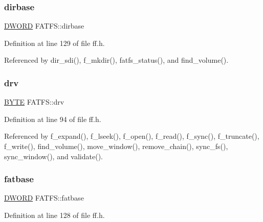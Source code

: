 \mbox{\label{structFATFS_a3f72fd998dbcce4652a85a81fe944bc4}} 
\subsubsection{\texorpdfstring{dirbase}{dirbase}}
{\footnotesize\ttfamily \hyperlink{integer_8h_ad342ac907eb044443153a22f964bf0af}{D\+W\+O\+RD} F\+A\+T\+F\+S\+::dirbase}



Definition at line 129 of file ff.\+h.



Referenced by dir\+\_\+sdi(), f\+\_\+mkdir(), fatfs\+\_\+status(), and find\+\_\+volume().

\mbox{\label{structFATFS_a6a791560e2687e8b1569bfce61208d2d}} 
\subsubsection{\texorpdfstring{drv}{drv}}
{\footnotesize\ttfamily \hyperlink{integer_8h_a4ae1dab0fb4b072a66584546209e7d58}{B\+Y\+TE} F\+A\+T\+F\+S\+::drv}



Definition at line 94 of file ff.\+h.



Referenced by f\+\_\+expand(), f\+\_\+lseek(), f\+\_\+open(), f\+\_\+read(), f\+\_\+sync(), f\+\_\+truncate(), f\+\_\+write(), find\+\_\+volume(), move\+\_\+window(), remove\+\_\+chain(), sync\+\_\+fs(), sync\+\_\+window(), and validate().

\mbox{\label{structFATFS_a848fba02c4aabe02ef2984e578f33d64}} 
\subsubsection{\texorpdfstring{fatbase}{fatbase}}
{\footnotesize\ttfamily \hyperlink{integer_8h_ad342ac907eb044443153a22f964bf0af}{D\+W\+O\+RD} F\+A\+T\+F\+S\+::fatbase}



Definition at line 128 of file ff.\+h.



